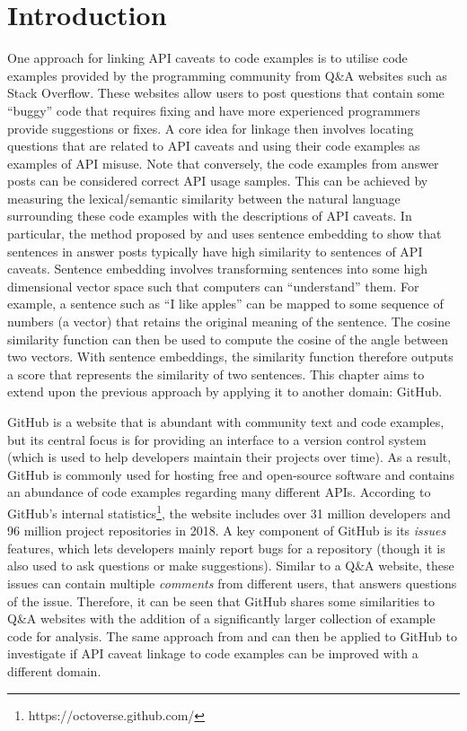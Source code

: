 \section{Introduction}
\label{sec:info-intro}
One approach for linking API caveats to code examples is to utilise code examples provided by the programming community from Q\&A websites such as Stack Overflow. These websites allow users to post questions that contain some ``buggy'' code that requires fixing and have more experienced programmers provide suggestions or fixes. A core idea for linkage then involves locating questions that are related to API caveats and using their code examples as examples of API misuse. Note that conversely, the code examples from answer posts can be considered correct API usage samples. This can be achieved by measuring the lexical/semantic similarity between the natural language surrounding these code examples with the descriptions of API caveats. In particular, the method proposed by \cite{jiamou} and \cite{xiaoxue} uses sentence embedding to show that sentences in answer posts typically have high similarity to sentences of API caveats. Sentence embedding involves transforming sentences into some high dimensional vector space such that computers can ``understand'' them. For example, a sentence such as ``I like apples'' can be mapped to some sequence of numbers (a vector) that retains the original meaning of the sentence. The cosine similarity function can then be used to compute the cosine of the angle between two vectors. With sentence embeddings, the similarity function therefore outputs a score that represents the similarity of two sentences. This chapter aims to extend upon the previous approach by applying it to another domain: GitHub. \bigbreak

GitHub is a website that is abundant with community text and code examples, but its central focus is for providing an interface to a version control system (which is used to help developers maintain their projects over time). As a result, GitHub is commonly used for hosting free and open-source software and contains an abundance of code examples regarding many different APIs. According to GitHub's internal statistics\footnote{https://octoverse.github.com/}, the website includes over 31 million developers and 96 million project repositories in 2018. A key component of GitHub is its \textit{issues} features, which lets developers mainly report bugs for a repository (though it is also used to ask questions or make suggestions). Similar to a Q\&A website, these issues can contain multiple \textit{comments} from different users, that answers questions of the issue. Therefore, it can be seen that GitHub shares some similarities to Q\&A websites with the addition of a significantly larger collection of example code for analysis. The same approach from \cite{jiamou} and \cite{xiaoxue} can then be applied to GitHub to investigate if API caveat linkage to code examples can be improved with a different domain. \bigbreak

